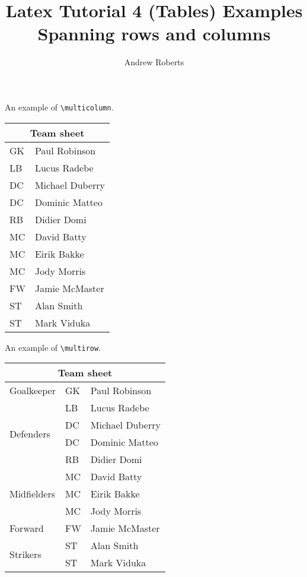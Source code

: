 \documentclass[english]{article}
\begin{document}
\title{Latex Tutorial 4 (Tables) Examples\\
       Spanning rows and columns}

\author{Andrew Roberts}
\maketitle

An example of \texttt{\textbackslash multicolumn}.

\vspace{\baselineskip}

\begin{tabular}{|l|l|}
\hline
\multicolumn{2}{|c|}{Team sheet} \\
\hline
GK & Paul Robinson \\
LB & Lucus Radebe \\
DC & Michael Duberry \\
DC & Dominic Matteo \\
RB & Didier Domi \\
MC & David Batty \\
MC & Eirik Bakke \\
MC & Jody Morris \\
FW & Jamie McMaster \\
ST & Alan Smith \\
ST & Mark Viduka \\
\hline
\end{tabular}

\vspace{\baselineskip}

An example of \texttt{\textbackslash multirow}.

\vspace{\baselineskip}

\begin{tabular}{|l|l|l|}
\hline
\multicolumn{3}{|c|}{Team sheet} \\
\hline
Goalkeeper & GK & Paul Robinson \\ \hline
\multirow{4}{*}{Defenders} & LB & Lucus Radebe \\
& DC & Michael Duberry \\
& DC & Dominic Matteo \\
& RB & Didier Domi \\ \hline
\multirow{3}{*}{Midfielders} & MC & David Batty \\
 & MC & Eirik Bakke \\
 & MC & Jody Morris \\ \hline
Forward & FW & Jamie McMaster \\ \hline
\multirow{2}{*}{Strikers} & ST & Alan Smith \\
 & ST & Mark Viduka \\
\hline
\end{tabular}
\end{document}

